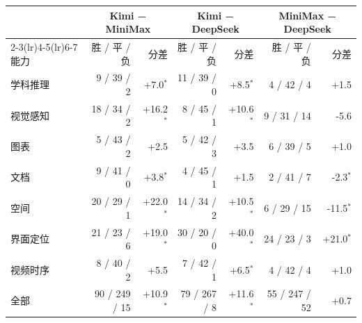 \begin{tabular}{l*{3}{rr}}
\toprule
 & \multicolumn{2}{c}{Kimi − MiniMax} & \multicolumn{2}{c}{Kimi − DeepSeek} & \multicolumn{2}{c}{MiniMax − DeepSeek} \\
\cmidrule(lr){2-3}\cmidrule(lr){4-5}\cmidrule(lr){6-7}
能力 & 胜 / 平 / 负 & 分差 & 胜 / 平 / 负 & 分差 & 胜 / 平 / 负 & 分差 \\
\midrule
学科推理 & 9 / 39 / 2 & +7.0$^{*}$ & 11 / 39 / 0 & +8.5$^{*}$ & 4 / 42 / 4 & +1.5 \\
视觉感知 & 18 / 34 / 2 & +16.2$^{*}$ & 8 / 45 / 1 & +10.6$^{*}$ & 9 / 31 / 14 & -5.6 \\
图表 & 5 / 43 / 2 & +2.5 & 5 / 42 / 3 & +3.5 & 6 / 39 / 5 & +1.0 \\
文档 & 9 / 41 / 0 & +3.8$^{*}$ & 4 / 45 / 1 & +1.5 & 2 / 41 / 7 & -2.3$^{*}$ \\
空间 & 20 / 29 / 1 & +22.0$^{*}$ & 14 / 34 / 2 & +10.5$^{*}$ & 6 / 29 / 15 & -11.5$^{*}$ \\
界面定位 & 21 / 23 / 6 & +19.0$^{*}$ & 30 / 20 / 0 & +40.0$^{*}$ & 24 / 23 / 3 & +21.0$^{*}$ \\
视频时序 & 8 / 40 / 2 & +5.5 & 7 / 42 / 1 & +6.5$^{*}$ & 4 / 42 / 4 & +1.0 \\
\midrule
全部 & 90 / 249 / 15 & +10.9$^{*}$ & 79 / 267 / 8 & +11.6$^{*}$ & 55 / 247 / 52 & +0.7 \\
\bottomrule
\end{tabular}
